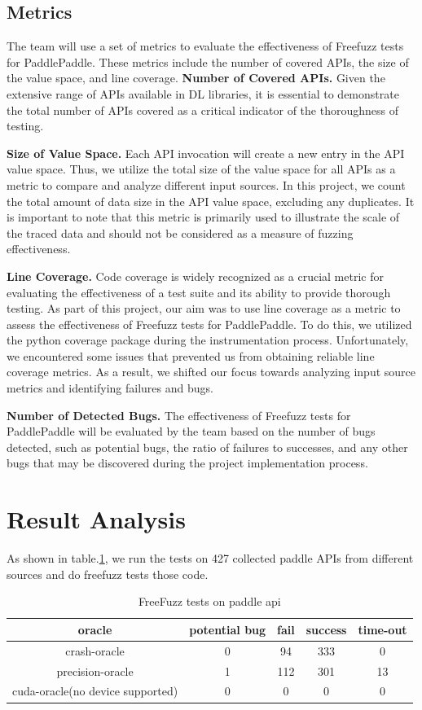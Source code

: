 \documentclass[sigconf]{acmart}
\begin{document}
  \subsection{Metrics}
  The team will use a set of metrics to evaluate the effectiveness of Freefuzz tests for PaddlePaddle. 
  These metrics include the number of covered APIs, the size of the value space, and line coverage.
  \textbf{Number of Covered APIs.} Given the extensive range of APIs available in DL libraries, it is essential to demonstrate the total number of APIs covered as a critical indicator of the thoroughness of testing.
  
  \textbf{Size of Value Space.} Each API invocation will create a new entry in the API value space. 
  Thus, we utilize the total size of the value space for all APIs as a metric to compare and analyze different input sources. 
  In this project, we count the total amount of data size in the API value space, excluding any duplicates. 
  It is important to note that this metric is primarily used to illustrate the scale of the traced data and should not be considered as a measure of fuzzing effectiveness.
  
  \textbf{Line Coverage.} Code coverage is widely recognized as a crucial metric for evaluating the effectiveness of a test suite and its ability to provide thorough testing. 
  As part of this project, our aim was to use line coverage as a metric to assess the effectiveness of Freefuzz tests for PaddlePaddle. 
  To do this, we utilized the python coverage package during the instrumentation process. 
  Unfortunately, we encountered some issues that prevented us from obtaining reliable line coverage metrics. 
  As a result, we shifted our focus towards analyzing input source metrics and identifying failures and bugs.

  \textbf{Number of Detected Bugs.} The effectiveness of Freefuzz tests for PaddlePaddle will be evaluated by the team based on the number of bugs detected, 
  such as potential bugs, the ratio of failures to successes, and any other bugs that may be discovered during the project implementation process.

  \section{Result Analysis}
  As shown in table.\ref*{tab:freq}, we run the tests on 427 collected paddle APIs from different sources and do freefuzz tests those code.
  \begin{table}[t]
    \centering
    \caption{FreeFuzz tests on paddle api}
    \label{tab:freq}
    \begin{tabular}{ccccc}
      \toprule
      oracle&potential bug&fail&success&time-out\\
      \midrule
      crash-oracle & 0 & 94 & 333 &0\\
      precision-oracle & 1&112&301 &13 \\
      cuda-oracle(no device supported) & 0 & 0 & 0 &0\\
    \bottomrule
  \end{tabular}
  \end{table}
\end{document}
